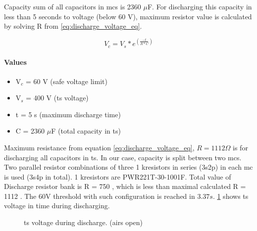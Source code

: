 Capacity sum of all capacitors in \glspl{mc} is 2360 $\mu$F. For discharging this capacity in less than 5 seconds to voltage (below 60 V), maximum resistor value is calculated by solving R from \ref{eq:discharge_voltage_eq}.

\begin{equation}
	V_{c}=V_{s}*e^{(\frac{-t}{R*C})}
	\label{eq:discharge_voltage_eq}
\end{equation}

\paragraph{Values}
\begin{itemize}
	\item V$_c$ = 60 V (safe voltage limit)
	\item V$_s$ = 400 V (\gls{ts} voltage)
	\item t = 5 s (maximum discharge time)
	\item C = 2360 $\mu$F (total capacity in \gls{ts})
\end{itemize}

Maximum resistance from equation \ref{eq:discharge_voltage_eq}, $R = 1112\Omega$ is for discharging all capacitors in \gls{ts}. In our case, capacity is split between two \glspl{mc}. Two parallel resistor combinations of three 1 k\ohm resistors in series (3s2p) in each \gls{mc} is used (3s4p in total). 1 k\ohm resistors are PWR221T-30-1001F. Total value of Discharge resistor bank is R = 750 \ohm, which is less than maximal calculated R = 1112 \ohm. The 60V threshold with such configuration is reached in $3.37s$. \ref{fig:discharge_voltage_time} shows \gls{ts} voltage in time during discharging.

\begin{figure}
	\caption{\gls{ts} voltage during discharge. (\glspl{air} open)}
	\label{fig:discharge_voltage_time}
\end{figure}


